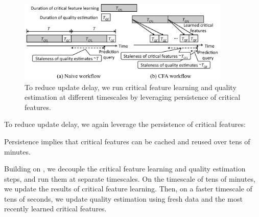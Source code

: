 \begin{figure}[t!]
\centering
\includegraphics[width=0.9\textwidth]{figures/cfa-scalability-naive-cfa.pdf}
\caption{To reduce update delay, we run critical feature learning 
and quality estimation at different timescales by leveraging 
persistence of critical features.}
\label{fig:scalable-workflow}
\end{figure}

To reduce update delay, we again leverage the 
persistence of critical features:

\begin{imp}
Persistence implies that critical features can be cached and reused
 over tens of minutes.
\label{imp:reducing}
\end{imp}


 Building on , we decouple the 
critical feature learning and quality estimation steps, and run
them at separate timescales.
On the timescale of tens of minutes, we update the results of 
critical feature learning. Then, on a faster timescale of tens of seconds, 
we update quality estimation using fresh data and the most recently
learned critical features. 

